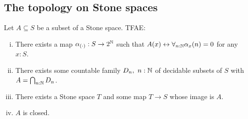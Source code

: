 \subsection{The topology on Stone spaces}
\begin{theorem}\label{StoneClosedSubsets}
  Let $A\subseteq S$ be a subset of a Stone space. TFAE:
  \begin{enumerate}[(i)]
    \item There exists a map $\alpha_{(\cdot)}:S \to 2^{\mathbb{N}}$ such that 
      $A (x) \leftrightarrow \forall_{n:\mathbb{N}} \alpha_x(n) = 0$ for any $x:S$. 
    \item There exists some countable family 
      $D_n,~{n:\mathbb{N}}$ 
      of decidable subsets of $S$ with $A = \bigcap_{n:\mathbb{N}} D_n$. 
    \item There exists a Stone space $T$ and some map $T\to S$ whose image is $A$. 
    \item $A$ is closed.
  \end{enumerate}
\end{theorem}
